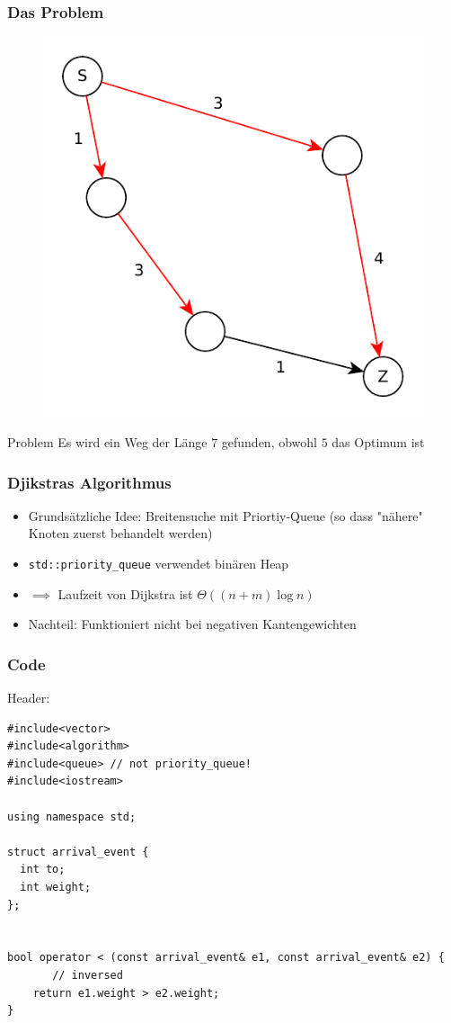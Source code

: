 \begin{frame}
\frametitle{Das Problem}
\begin{figure}
\includegraphics[scale=.8]{dijkstra_graphs/bfs_fail_4.pdf}
\end{figure}

\begin{alertblock}{Problem}
Es wird ein Weg der Länge $7$ gefunden, obwohl $5$ das Optimum ist
\end{alertblock}
\end{frame}


\begin{frame}
\frametitle{Djikstras Algorithmus}
\begin{itemize}
\item Grundsätzliche Idee: Breitensuche mit Priortiy-Queue (so dass "nähere" Knoten zuerst behandelt werden)
\item \lstinline|std::priority_queue| verwendet binären Heap
\item $\implies$ Laufzeit von Dijkstra ist $\Theta((n + m) \log n)$
\item Nachteil: Funktioniert nicht bei negativen Kantengewichten
\end{itemize}
\end{frame}

\begin{frame}[fragile]
\frametitle{Code}
Header: 
\begin{lstlisting}[basicstyle=\tiny]
#include<vector>
#include<algorithm>
#include<queue> // not priority_queue!
#include<iostream>

using namespace std;

struct arrival_event {
  int to;
  int weight;
};


bool operator < (const arrival_event& e1, const arrival_event& e2) {
	   // inversed
    return e1.weight > e2.weight;
}
\end{lstlisting}

\end{frame}


